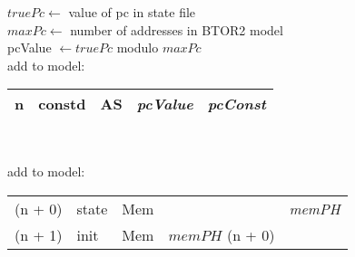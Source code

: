 \begin{algorithm}
    $truePc \leftarrow$ value of pc in state file\\
    $maxPc \leftarrow$ number of addresses in BTOR2 model\\
    \textcolor{UniBlue}{pcValue} $\leftarrow truePc$ modulo $maxPc$\\
    add to model:\\
    \begin{tabular}[h]{>{\color{UniRed}}r l >{\color{UniGrey}}l l >{\slshape} l}
        \hline
        \hline
        \ttfamily
        n & constd & AS & \textcolor{UniBlue}{\rmfamily\textsl{pcValue}} & pcConst \\
        \hline
        \hline
    \end{tabular}\\
    \BlankLine

    \BlankLine
    add to model:\\

    \begin{tabular}[h]{>{\ttfamily\color{UniRed}}r >{\ttfamily}l >{\ttfamily\color{UniGrey}}l >{\ttfamily}l >{\slshape} l}
        \hline
        \hline
        (n + 0) & state & Mem &                                     & memPH \\
        (n + 1) & init  & Mem & \textcolor{UniRed}{$memPH$ (n + 0)} &       \\
        \hline
        \hline
    \end{tabular}\\


\end{algorithm}
